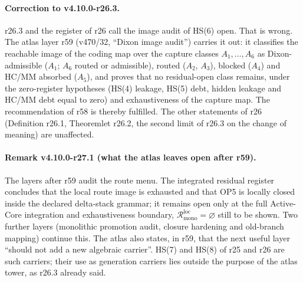 \paragraph{Correction to v4.10.0-r26.3.}
r26.3 and the register of r26 call the image audit of HS(6) open.  That is wrong.  The atlas layer r59 (v470/32, ``Dixon image audit'')
carries it out: it classifies the reachable image of the coding map over the capture classes \(A_1,\dots,A_6\) as Dixon-admissible (\(A_1\);
\(A_6\) routed or admissible), routed (\(A_2\), \(A_3\)), blocked (\(A_4\)) and HC/MM absorbed (\(A_5\)), and proves that no residual-open class
remains, under the zero-register hypotheses (HS(4) leakage, HS(5) debt, hidden leakage and HC/MM debt equal to zero) and exhaustiveness of
the capture map.  The recommendation of r58 is thereby fulfilled.  The other statements of r26 (Definition r26.1, Theoremlet r26.2, the
second limit of r26.3 on the change of meaning) are unaffected.

\paragraph{Remark v4.10.0-r27.1 (what the atlas leaves open after r59).}
The layers after r59 audit the route menu.  The integrated residual register concludes that the local route image is exhausted and that
OP5 is locally closed inside the declared delta-stack grammar; it remains open only at the full Active-Core integration and exhaustiveness
boundary, \(\mathcal R^{\mathrm{loc}}_{\mathrm{mono}}=\varnothing\) still to be shown.  Two further layers (monolithic promotion audit, closure
hardening and old-branch mapping) continue this.  The atlas also states, in r59, that the next useful layer ``should not add a new algebraic
carrier''.  HS(7) and HS(8) of r25 and r26 are such carriers; their use as generation carriers lies outside the purpose of the atlas
tower, as r26.3 already said.

